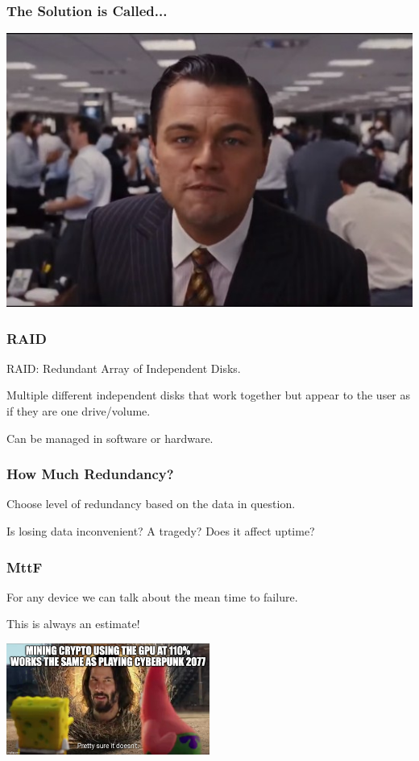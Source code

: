 \begin{frame}
\frametitle{The Solution is Called...}

\begin{center}
	\includegraphics[width=\textwidth]{images/leo.jpg}
\end{center}

\end{frame}


\begin{frame}
\frametitle{RAID}

RAID: Redundant Array of Independent Disks.


Multiple different independent disks that work together but appear to the user as if they are one drive/volume.

Can be managed in software or hardware.

\end{frame}


\begin{frame}
\frametitle{How Much Redundancy?}

Choose level of redundancy based on the data in question.

Is losing data inconvenient? A tragedy? Does it affect uptime?

\end{frame}


\begin{frame}
\frametitle{MttF}

For any device we can talk about the \alert{mean time to failure}.

This is always an estimate!

\begin{center}
	\includegraphics[width=0.5\textwidth]{images/keanu.jpg}
\end{center}

\end{frame}


